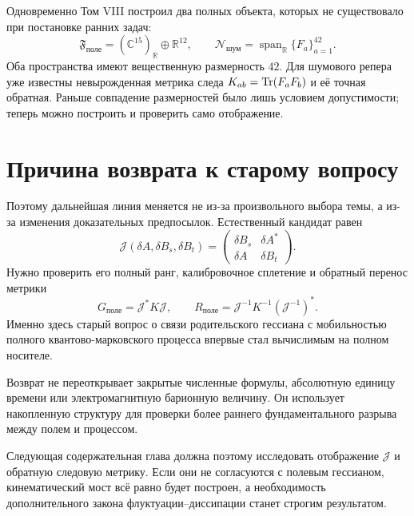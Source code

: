 Одновременно Том VIII построил два полных объекта, которых не существовало
при постановке ранних задач:
\begin{equation}
 \mathfrak F_{\text{поле}}
 =(\mathbb C^{15})_{\mathbb R}\oplus\mathbb R^{12},
 \qquad
 \mathcal N_{\text{шум}}
 =\operatorname{span}_{\mathbb R}\{F_a\}_{a=1}^{42}.
 \label{eq:v8-temporary-boundary-two-complete-carriers}
\end{equation}
Оба пространства имеют вещественную размерность $42$. Для шумового репера
уже известны невырожденная метрика следа $K_{ab}=\operatorname{Tr}(F_aF_b)$ и её точная
обратная. Раньше совпадение размерностей было лишь условием допустимости;
теперь можно построить и проверить само отображение.

\section{Причина возврата к старому вопросу}

Поэтому дальнейшая линия меняется не из-за произвольного выбора темы, а
из-за изменения доказательных предпосылок. Естественный кандидат равен
\begin{equation}
 \mathcal J(\delta A,\delta B_s,\delta B_t)
 =\begin{pmatrix}
   \delta B_s&\delta A^*\\
   \delta A&\delta B_t
  \end{pmatrix}.
 \label{eq:v8-temporary-boundary-field-noise-map}
\end{equation}
Нужно проверить его полный ранг, калибровочное сплетение и обратный перенос
метрики
\begin{equation}
 G_{\text{поле}}=\mathcal J^*K\mathcal J,
 \qquad
 R_{\text{поле}}=\mathcal J^{-1}K^{-1}(\mathcal J^{-1})^*.
 \label{eq:v8-temporary-boundary-pulled-metrics}
\end{equation}
Именно здесь старый вопрос о связи родительского гессиана с мобильностью
полного квантово-марковского процесса впервые стал вычислимым на полном
носителе.

\begin{remark}
Возврат не переоткрывает закрытые численные формулы, абсолютную единицу
времени или электромагнитную барионную величину. Он использует накопленную
структуру для проверки более раннего фундаментального разрыва между полем
и процессом.
\end{remark}

Следующая содержательная глава должна поэтому исследовать отображение
$\mathcal J$ и обратную следовую метрику. Если они не согласуются с полевым
гессианом, кинематический мост всё равно будет построен, а необходимость
дополнительного закона флуктуации--диссипации станет строгим результатом.